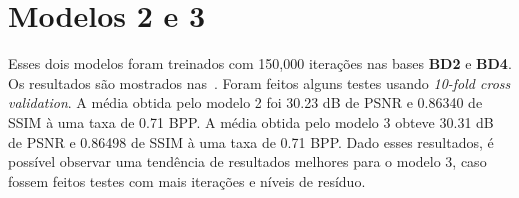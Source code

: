 
\section{Modelos 2 e 3}
\label{res:6levels}
Esses dois modelos foram treinados com 150,000 iterações nas bases \textbf{BD2} e \textbf{BD4}. Os resultados são mostrados nas~. Foram feitos alguns testes usando \textit{10-fold cross validation}. A média obtida pelo modelo 2 foi 30.23 dB de \acrshort{PSNR} e 0.86340 de \acrshort{SSIM} à uma taxa de 0.71 \acrshort{BPP}. A média obtida pelo modelo 3 obteve 30.31 dB de \acrshort{PSNR} e 0.86498 de \acrshort{SSIM} à uma taxa de 0.71 \acrshort{BPP}. Dado esses resultados, é possível observar uma tendência de resultados melhores para o modelo 3, caso fossem feitos testes com mais iterações e níveis de resíduo. 

